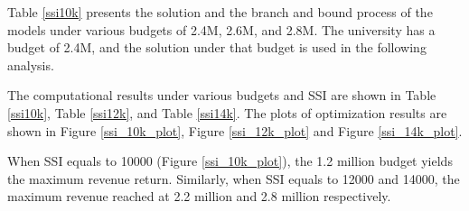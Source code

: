 \documentclass[12pt,english]{report}
\begin{document}
Table \ref{ssi10k}  presents the solution and the branch and bound process of
the models 
under various budgets of 2.4M, 2.6M, and 2.8M.  The university has a budget of
2.4M, and
the solution under that budget is used in the following analysis.

The computational results under various budgets and SSI are shown in Table
\ref{ssi10k}, Table \ref{ssi12k}, and Table \ref{ssi14k}.
The plots of optimization results are shown in  Figure \ref{ssi_10k_plot},
Figure \ref{ssi_12k_plot} and Figure \ref{ssi_14k_plot}.

When SSI equals to 10000 (Figure \ref{ssi_10k_plot}), the 1.2 million budget
yields the 
maximum revenue return. Similarly, when SSI equals to 12000 and 14000, the
maximum revenue
reached at 2.2 million and 2.8 million respectively.


%
%
\end{document}

